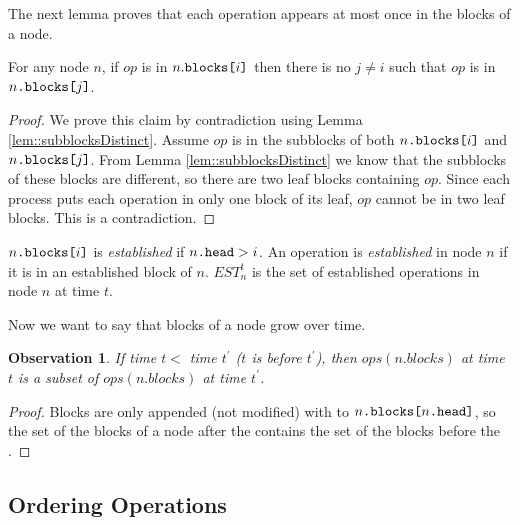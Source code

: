 \documentclass[acmsmall,nonacm,anonymous]{acmart}
\renewcommand{\it}[1]{\textit{#1}}
\newcommand{\nf}[1]{{\normalfont{\texttt{#1}}}}
\newtheorem{observation}[theorem]{Observation}
\begin{document}
The next lemma proves that each operation appears at most once in the blocks of a node.
\begin{lemma}\label{lem::noDuplicates}
For any node $n$, if $op$ is in $n.\nf{blocks[}i\nf{]}$ then there is no $j\neq i$ such that $op$ is in $n\nf{.blocks[}j\nf{]}$.
\end{lemma}
\begin{proof}
We prove this claim by contradiction using Lemma \ref{lem::subblocksDistinct}. Assume $op$ is in the subblocks of both $n\nf{.blocks[}i\nf{]}$ and $n\nf{.blocks[}j\nf{]}$. From Lemma \ref{lem::subblocksDistinct} we know that the subblocks of these blocks are different, so there are two leaf blocks containing $op$. Since each process puts each operation in only one block of its leaf, $op$ cannot be in two leaf blocks. This is a contradiction.
\end{proof}

\begin{definition}
$n\nf{.blocks[}i\nf{]}$ is \emph{established} if $n\nf{.head}>i$. An operation is \it{established} in node $n$ if it is in an established block of $n$. $EST^t_n$ is the set of established operations in node $n$ at time $t$.
\end{definition}

Now we want to say that blocks of a node grow over time.
\begin{observation}\label{lem::blocksOrder}
  If  time $t<$ time $t^\prime$ ($t$ is before $t^\prime$), then $ops(n.blocks)$ at time $t$ is a subset of $ops(n.blocks)$ at time $t^\prime$.
\end{observation}
\begin{proof}
Blocks are only appended (not modified) with \nf{CAS} to $n\nf{.blocks[}n\nf{.head]}$, so the set of the blocks of a node after the \nf{CAS} contains the set of the blocks before the \nf{CAS}.
\end{proof}



\subsection{Ordering Operations}
\end{document}

